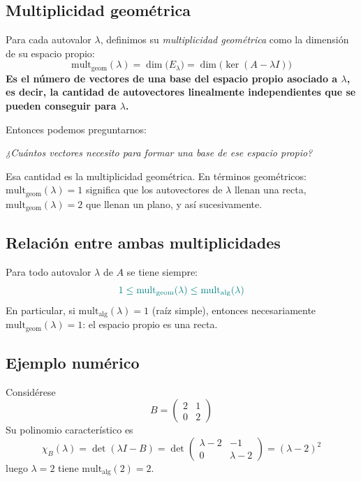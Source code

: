 \documentclass{article}
\begin{document}
\subsection*{Multiplicidad geométrica}
Para cada autovalor \(\lambda\), definimos su \emph{multiplicidad geométrica} como la dimensión de su espacio propio:
\[
  \mathrm{mult}_{\mathrm{geom}}(\lambda)
  = \dim\bigl(E_\lambda\bigr)
  = \dim\bigl(\ker(A - \lambda I)\bigr)
\]
\textbf{\color{teal}Es el número de vectores de una base del espacio propio asociado a \(\lambda\), es decir, la cantidad de autovectores linealmente independientes que se pueden conseguir para \(\lambda\).}

Entonces podemos preguntarnos:

\begin{center}
\emph{¿Cuántos vectores necesito para formar una base de ese espacio propio?}
\end{center}

Esa cantidad es la multiplicidad geométrica. En términos geométricos: \(\mathrm{mult}_{\mathrm{geom}}(\lambda)=1\) significa que los autovectores de \(\lambda\) llenan una recta, \(\mathrm{mult}_{\mathrm{geom}}(\lambda)=2\) que llenan un plano, y así sucesivamente.

\subsection*{Relación entre ambas multiplicidades}
Para todo autovalor \(\lambda\) de \(A\) se tiene siempre:
\[\color{teal}
  1 \le \mathrm{mult}_{\mathrm{geom}}(\lambda)
  \le \mathrm{mult}_{\mathrm{alg}}(\lambda)
\]
En particular, si \(\mathrm{mult}_{\mathrm{alg}}(\lambda)=1\) (raíz simple), entonces necesariamente \(\mathrm{mult}_{\mathrm{geom}}(\lambda)=1\): el espacio propio es una recta.

\subsection*{Ejemplo numérico}
Considérese
\[
  B = \begin{pmatrix}
    2 & 1\\
    0 & 2
  \end{pmatrix}
\]
Su polinomio característico es
\[
  \chi_B(\lambda) = \det(\lambda I - B)
  = \det\begin{pmatrix}
  \lambda-2 & -1\\
  0 & \lambda-2
  \end{pmatrix}
  = (\lambda-2)^2
\]
luego \(\lambda=2\) tiene \(\mathrm{mult}_{\mathrm{alg}}(2)=2\).
\end{document}
